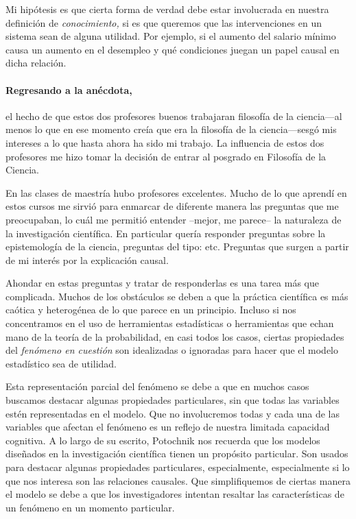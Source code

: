 Mi hipótesis es que cierta forma de verdad debe estar
involucrada en nuestra definición de \emph{conocimiento,} si
es que queremos que las intervenciones en un sistema sean de
alguna utilidad. Por ejemplo, si el aumento del salario
mínimo causa un aumento en el desempleo y qué condiciones
juegan un papel causal en dicha relación.

\paragraph{Regresando a la anécdota,} el hecho de que estos
dos profesores buenos trabajaran filosofía de la ciencia---al 
menos lo que en ese momento creía que era la filosofía de la
ciencia---sesgó mis intereses a lo que hasta ahora ha sido mi
trabajo. La influencia de estos dos profesores me hizo tomar
la decisión de entrar al posgrado en Filosofía de la Ciencia.

En las clases de maestría hubo profesores excelentes. Mucho
de lo que aprendí en estos cursos me sirvió para enmarcar de
diferente manera las preguntas que me preocupaban, lo cuál
me permitió entender --mejor, me parece-- la naturaleza de
la investigación científica. En particular quería
responder preguntas sobre la epistemología de la ciencia,
preguntas del tipo:    etc. Preguntas que
surgen a partir de mi interés por la explicación causal.

Ahondar en estas preguntas y tratar de responderlas es una
tarea más que complicada. Muchos de los obstáculos se
deben a que la práctica científica es más caótica y
heterogénea de lo que parece en un principio. Incluso si
nos concentramos en el uso de herramientas estadísticas o
herramientas que echan mano de la teoría de la
probabilidad, en casi todos los casos, ciertas propiedades
del \emph{fenómeno en cuestión} son idealizadas o
ignoradas para hacer que el modelo estadístico sea de
utilidad.

Esta representación parcial del fenómeno se debe a que en
muchos casos buscamos destacar algunas propiedades
particulares, sin que todas las variables estén
representadas en el modelo. Que no involucremos todas y cada
una de las variables que afectan el fenómeno es un reflejo
de nuestra limitada capacidad cognitiva. A lo largo de su
escrito, Potochnik nos recuerda que los modelos diseñados en
la investigación científica tienen un propósito particular.
Son usados para destacar algunas propiedades particulares,
especialmente, especialmente si lo que nos interesa son
las relaciones causales. Que simplifiquemos de ciertas manera el
modelo se debe a que los investigadores intentan resaltar las
características de un fenómeno en un momento particular.

